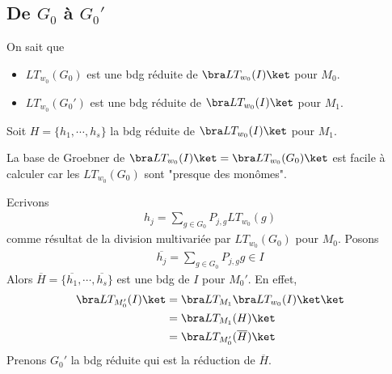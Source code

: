         \subsection{De $G_0$ à $G_0'$}
            On sait que
            \begin{itemize}
                \item $LT_{w_0}(G_0)$ est une bdg réduite de $\bra LT_{w_0}(I) \ket$ pour $M_0$.
                \item $LT_{w_0}(G_0')$ est une bdg réduite de $\bra LT_{w_0}(I) \ket$ pour $M_1$.
            \end{itemize}
            Soit $H = \{h_1, \cdots, h_s\}$ la bdg réduite de $\bra LT_{w_0}(I)\ket$ pour $M_1$.
            \begin{remq}
                La base de Groebner de $\bra LT_{w_0}(I) \ket = \bra LT_{w_0}(G_0) \ket$ est facile à calculer car les $LT_{w_0}(G_0)$ sont "presque des monômes".
            \end{remq}
            Ecrivons 
            \begin{align*}
                h_j = \sum_{g \in G_0} P_{j,g} LT_{w_0}(g)
            \end{align*}
            comme résultat de la division multivariée par $LT_{w_0}(G_0)$ pour $M_0$. Posons 
            \begin{align*}
                \overline{h_j} = \sum_{g \in G_0} P_{j,g} g \in I
            \end{align*}
            Alors $\overline{H} = \{\overline{h_1}, \cdots, \overline{h_s}\}$ est une bdg de $I$ pour $M_0'$. En effet, 
            \begin{align*}
                \bra LT_{M_0'}(I) \ket &= \bra LT_{M_1} \bra LT_{w_0}(I) \ket \ket \\
                &= \bra LT_{M_1}(H) \ket \\
                &= \bra LT_{M_0'}(\overline{H}) \ket \\
            \end{align*}
            Prenons $G_0'$ la bdg réduite qui est la réduction de $\overline{H}$.

